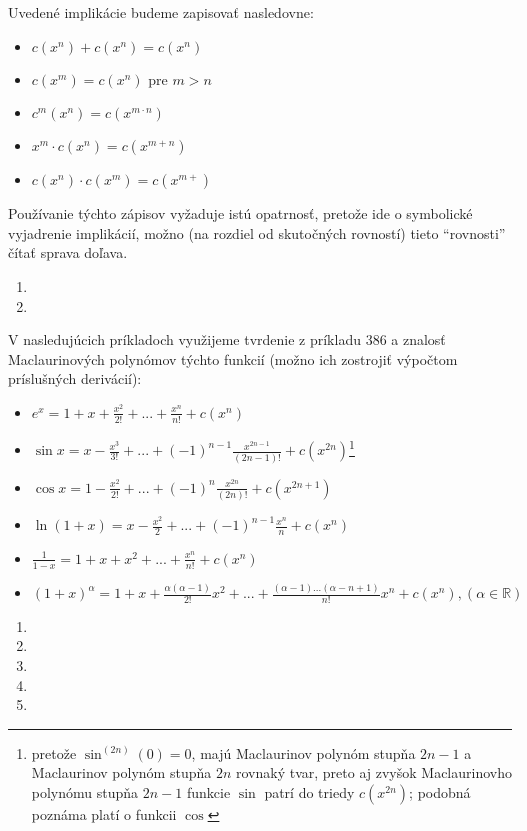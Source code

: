Uvedené implikácie budeme zapisovať nasledovne:
\begin{itemize}
\item $c(x^n)+c(x^n)=c(x^n)$
\item $c(x^m)=c(x^n)$ pre $m>n$
\item $c^m(x^n)=c(x^{m\cdot n})$
\item $x^m\cdot c(x^n)=c(x^{m+n})$
\item $c(x^n)\cdot c(x^m)=c(x^{m+})$
\end{itemize}

Používanie týchto zápisov vyžaduje istú opatrnosť, pretože ide o symbolické
vyjadrenie implikácií, možno (na rozdiel od skutočných rovností) tieto
\enquote{rovnosti} čítať sprava doľava.

\begin{enumerate}[resume]
  \item {}
  \item {}
\end{enumerate}

V nasledujúcich príkladoch využijeme tvrdenie z príkladu $386$ a znalosť
Maclaurinových polynómov týchto funkcií (možno ich zostrojiť výpočtom
príslušných derivácií):
\begin{itemize}
\item
  $e^x=1+x+\frac{x^2}{2!}+...+\frac{x^n}{n!}+c(x^n)$
\item
  $\sin
  x=x-\frac{x^3}{3!}+...+(-1)^{n-1}\frac{x^{2n-1}}{(2n-1)!}+c(x^{2n})$\footnote{pretože
  $\sin^{(2n)}(0)=0$, majú Maclaurinov polynóm stupňa $2n-1$ a Maclaurinov
  polynóm stupňa $2n$ rovnaký tvar, preto aj zvyšok Maclaurinovho polynómu
  stupňa $2n-1$ funkcie $\sin$ patrí do triedy $c(x^{2n})$; podobná poznáma
  platí o funkcii $\cos$}
\item
  $\cos x=1-\frac{x^2}{2!}+...+(-1)^{n}\frac{x^{2n}}{(2n)!}+c(x^{2n+1})$
\item
  $\ln (1+x)=x-\frac{x^2}{2}+...+(-1)^{n-1}\frac{x^n}{n}+c(x^n)$
\item
  $\frac{1}{1-x}=1+x+x^2+...+\frac{x^n}{n!}+c(x^n)$
\item
  $(1+x)^{\alpha}=1+x+\frac{\alpha(\alpha-1)}{2!}x^2+...+\frac{(\alpha-1) ...
  (\alpha-n+1)}{n!}x^n+c(x^n),(\alpha\in\mathbb{R})$
\end{itemize}

\begin{enumerate}[resume]
  \item {}
  \item {}
  \item {}
  \item {}
  \item {}
\end{enumerate}

